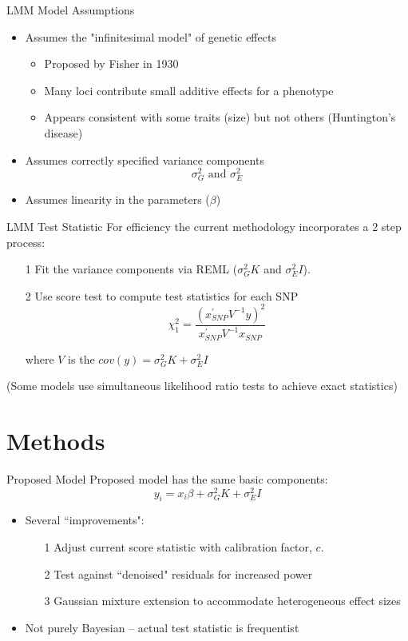\documentclass[aspectratio=169]{beamer}\usepackage[]{graphicx}\usepackage[]{color}
\begin{document}
\begin{frame}{LMM Model Assumptions}
\begin{itemize}
\item Assumes the "infinitesimal model" of genetic effects
\pause
\begin{itemize}
\item Proposed by Fisher in 1930
\item Many loci contribute small additive effects for a phenotype
\item Appears consistent with some traits (size) but not others (Huntington's disease)
\end{itemize}
\pause
\item Assumes correctly specified variance components
$$\sigma^2_G \text{ and } \sigma^2_E$$
\pause
\item Assumes linearity in the parameters ($\beta$)
\end{itemize}
\end{frame}

\begin{frame}{LMM Test Statistic}
For efficiency the current methodology incorporates a 2 step process:
\pause
\begin{itemize}
\item[1] Fit the variance components via REML ($\sigma^2_GK$ and $\sigma^2_EI$).
\pause
\item[2] Use score test to compute test statistics for each SNP
$$\chi^2_1 = \frac{\left(x^{\prime}_{SNP}V^{-1}y\right)^2}{x^{\prime}_{SNP}V^{-1}x_{SNP}}$$

where $V$ is the $cov(y) =  \sigma^2_GK + \sigma^2_EI$
\end{itemize}
(Some models use simultaneous likelihood ratio tests to achieve exact statistics)
\end{frame}

\section{Methods}

\begin{frame}{Proposed Model}
Proposed model has the same basic components:
$$y_i = x_{i}\beta + \sigma^2_GK + \sigma^2_EI$$
\pause
\begin{itemize}
\item Several ``improvements":
\begin{itemize}
\item[1] Adjust current score statistic with calibration factor, $c$.
\item[2] Test against ``denoised" residuals for increased power
\item[3] Gaussian mixture extension to accommodate heterogeneous effect sizes
\end{itemize}
\pause
\item Not purely Bayesian -- actual test statistic is frequentist
\end{itemize} 
\end{frame}
\end{document}
